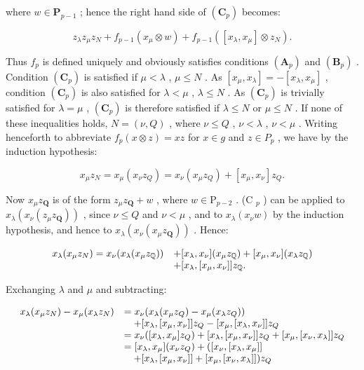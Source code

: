 where \(w \in \mathbf{P}_{p-1}\) ; hence the right hand side of \((\mathbf{C}_p)\) becomes:

\[
z _ {\lambda} z _ {\mu} z _ {N} + f _ {p - 1} (x _ {\mu} \otimes w) + f _ {p - 1} ([ x _ {\lambda}, x _ {\mu} ] \otimes z _ {N}).
\]

Thus \(f_{p}\) is defined uniquely and obviously satisfies conditions \((\mathbf{A}_{p})\) and \((\mathbf{B}_{p})\) . Condition \((\mathbf{C}_{p})\) is satisfied if \(\mu < \lambda\) , \(\mu \leqslant N\) . As \([x_{\mu}, x_{\lambda}] = -[x_{\lambda}, x_{\mu}]\) , condition \((\mathbf{C}_{p})\) is also satisfied for \(\lambda < \mu\) , \(\lambda \leqslant N\) . As \((\mathbf{C}_{p})\) is trivially satisfied for \(\lambda = \mu\) , \((\mathbf{C}_{p})\) is therefore satisfied if \(\lambda \leqslant N\) or \(\mu \leqslant N\) . If none of these inequalities holds, \(N = (\nu, Q)\) , where \(\nu \leqslant Q\) , \(\nu < \lambda\) , \(\nu < \mu\) . Writing henceforth to abbreviate \(f_{p}(x \otimes z) = xz\) for \(x \in g\) and \(z \in P_{p}\) , we have by the induction hypothesis:

\[
x _ {\mu} z _ {N} = x _ {\mu} (x _ {\nu} z _ {Q}) = x _ {\nu} (x _ {\mu} z _ {Q}) + [ x _ {\mu}, x _ {\nu} ] z _ {Q}.
\]

Now \(x_{\mu}z_{\mathbf{Q}}\) is of the form \(z_{\mu}z_{\mathbf{Q}} + w\) , where \(w\in \mathrm{P}_{p - 2}\) . (C \(_{p}\) ) can be applied to \(x_{\lambda}(x_{\nu}(z_{\mu}z_{\mathbf{Q}}))\) , since \(\nu \leqslant Q\) and \(\nu < \mu\) , and to \(x_{\lambda}(x_{\nu}w)\) by the induction hypothesis, and hence to \(x_{\lambda}(x_{\nu}(x_{\mu}z_{\mathbf{Q}}))\) . Hence:

\[
\begin{array}{r l} x _ {\lambda} (x _ {\mu} z _ {N}) = x _ {\nu} (x _ {\lambda} (x _ {\mu} z _ {\mathbb {Q}})) & + [ x _ {\lambda}, x _ {\nu} ] (x _ {\mu} z _ {\mathbb {Q}}) + [ x _ {\mu}, x _ {\nu} ] (x _ {\lambda} z _ {\mathbb {Q}}) \\ & + [ x _ {\lambda}, [ x _ {\mu}, x _ {\nu} ] ] z _ {\mathbb {Q}}. \end{array}
\]

Exchanging \(\lambda\) and \(\mu\) and subtracting:

\[
\begin{array}{r l} {x _ {\lambda} (x _ {\mu} z _ {N}) - x _ {\mu} (x _ {\lambda} z _ {N})} & {= x _ {\nu} (x _ {\lambda} (x _ {\mu} z _ {Q}) - x _ {\mu} (x _ {\lambda} z _ {Q}))} \\ & {\quad + [ x _ {\lambda}, [ x _ {\mu}, x _ {\nu} ] ] z _ {Q} - [ x _ {\mu}, [ x _ {\lambda}, x _ {\nu} ] ] z _ {Q}} \\ & {= x _ {\nu} ([ x _ {\lambda}, x _ {\mu} ] z _ {Q}) + [ x _ {\lambda}, [ x _ {\mu}, x _ {\nu} ] ] z _ {Q} + [ x _ {\mu}, [ x _ {\nu}, x _ {\lambda} ] ] z _ {Q}} \\ & {= [ x _ {\lambda}, x _ {\mu} ] (x _ {\nu} z _ {Q}) + ([ x _ {\nu}, [ x _ {\lambda}, x _ {\mu} ] ]} \\ & {\quad + [ x _ {\lambda}, [ x _ {\mu}, x _ {\nu} ] ] + [ x _ {\mu}, [ x _ {\nu}, x _ {\lambda} ] ]) z _ {Q}} \end{array}
\]

